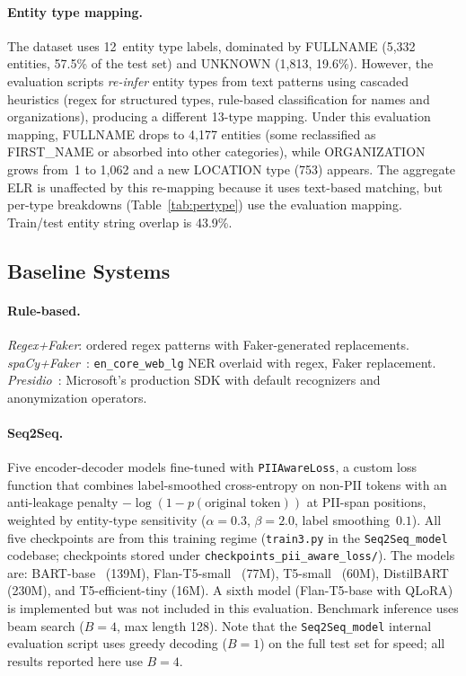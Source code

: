 \documentclass[10pt,twocolumn]{article}
\begin{document}
\paragraph{Entity type mapping.}
The dataset uses 12~entity type labels, dominated by FULLNAME (5{,}332 entities, 57.5\% of the test set) and UNKNOWN (1{,}813, 19.6\%).
However, the evaluation scripts \emph{re-infer} entity types from text patterns using cascaded heuristics (regex for structured types, rule-based classification for names and organizations), producing a different 13-type mapping.
Under this evaluation mapping, FULLNAME drops to 4{,}177 entities (some reclassified as FIRST\_NAME or absorbed into other categories), while ORGANIZATION grows from~1 to 1{,}062 and a new LOCATION type (753) appears.
The aggregate ELR is unaffected by this re-mapping because it uses text-based matching, but per-type breakdowns (Table~\ref{tab:pertype}) use the evaluation mapping.
Train/test entity string overlap is 43.9\%.

\subsection{Baseline Systems}

\paragraph{Rule-based.}
\emph{Regex+Faker}: ordered regex patterns with Faker-generated replacements.
\emph{spaCy+Faker}~\citep{spacy2020}: \texttt{en\_core\_web\_lg} NER overlaid with regex, Faker replacement.
\emph{Presidio}~\citep{presidio2023}: Microsoft's production SDK with default recognizers and anonymization operators.

\paragraph{Seq2Seq.}
Five encoder-decoder models fine-tuned with \texttt{PIIAwareLoss}, a custom loss function that combines label-smoothed cross-entropy on non-PII tokens with an anti-leakage penalty $-\log(1-p(\text{original token}))$ at PII-span positions, weighted by entity-type sensitivity ($\alpha\!=\!0.3$, $\beta\!=\!2.0$, label smoothing~$0.1$).
All five checkpoints are from this training regime (\texttt{train3.py} in the \texttt{Seq2Seq\_model} codebase; checkpoints stored under \texttt{checkpoints\_pii\_aware\_loss/}).
The models are: BART-base~\citep{lewis2020bart} (139M), Flan-T5-small~\citep{chung2022flant5} (77M), T5-small~\citep{raffel2020t5} (60M), DistilBART (230M), and T5-efficient-tiny (16M).
A sixth model (Flan-T5-base with QLoRA) is implemented but was not included in this evaluation.
Benchmark inference uses beam search ($B\!=\!4$, max length 128).
Note that the \texttt{Seq2Seq\_model} internal evaluation script uses greedy decoding ($B\!=\!1$) on the full test set for speed; all results reported here use $B\!=\!4$.
\end{document}
